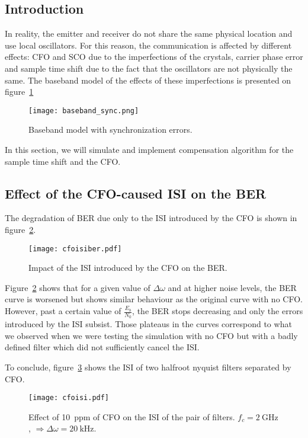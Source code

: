 \subsection{Introduction}
In reality, the emitter and receiver do not share the same physical location and use local oscillators.
For this reason, the communication is affected by different effects: CFO and SCO due to the imperfections of the crystals, carrier phase error and sample time shift due to the fact that the oscillators are not physically the same.
The baseband model of the effects of these imperfections is presented on figure~\ref{fig:sync}
\begin{figure}[htbp]
\texttt{[image: baseband\_sync.png]}
\caption{Baseband model with synchronization errors.\label{fig:sync}}
\end{figure}

In this section, we will simulate and implement compensation algorithm for the sample time shift and the CFO.
\subsection{Effect of the CFO-caused ISI on the BER}
The degradation of BER due only to the ISI introduced by the CFO is shown in figure~\ref{fig:cfoisiber}.
\begin{figure}[htbp]
\centering
\texttt{[image: cfoisiber.pdf]}
\caption{Impact of the ISI introduced by the CFO on the BER.\label{fig:cfoisiber}}
\end{figure}
Figure~\ref{fig:cfoisiber} shows that for a given value of $\Delta\omega$ and at higher noise levels, the BER curve is worsened but shows similar behaviour as the original curve with no CFO.
However, past a certain value of $\frac{E_b}{N_0}$, the BER stops decreasing and only the errors introduced by the ISI subsist.
Those plateaus in the curves correspond to what we observed when we were testing the simulation with no CFO but with a badly defined filter which did not sufficiently cancel the ISI.

To conclude, figure~\ref{fig:cfoisi} shows the ISI of two halfroot nyquist filters separated by CFO.
\begin{figure}[htbp]
    \centering
    \texttt{[image: cfoisi.pdf]}
    \caption{Effect of \SI{10}{ppm} of CFO on the ISI of the pair of filters. $f_c = \SI{2}{\giga\hertz}$, $\Rightarrow \Delta\omega = \SI{20}{\kilo\hertz}$.\label{fig:cfoisi}}
\end{figure}

